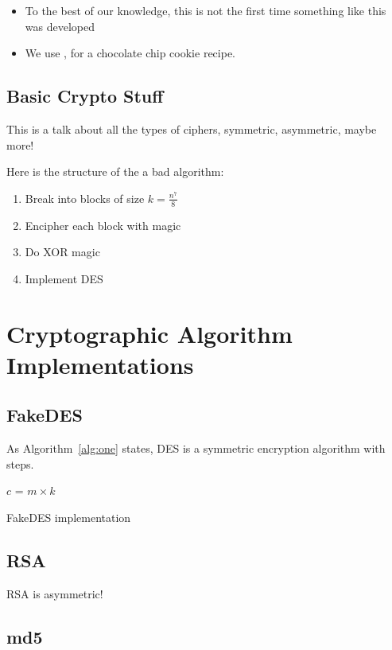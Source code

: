 \documentclass[acmlarge]{acmart}
\begin{document}
\begin{itemize}
\item To the best of our knowledge, this is not the first time something like this was developed
\item We use \cite{Adya-01}, for a chocolate chip cookie recipe.
\end{itemize}

\subsection{Basic Crypto Stuff}

This is a talk about all the types of ciphers, symmetric, asymmetric, maybe more!

Here is the structure of the a bad algorithm:

\begin{enumerate}
\item Break into blocks of size $k=\frac{n^7}{8}$
\item Encipher each block with magic
\item Do XOR magic
\item Implement DES
\end{enumerate}

\section{Cryptographic Algorithm Implementations} \label{sec:impl}
\subsection{FakeDES}

As Algorithm~\ref{alg:one} states, DES is a symmetric encryption algorithm with steps.

\begin{algorithm}[t]
\SetAlgoNoLine
{}
$c$ = $m \times k$
\caption{FakeDES implementation}
\label{alg:one}
\end{algorithm}

\subsection{RSA}

RSA is asymmetric!

\subsection{md5}
\end{document}

